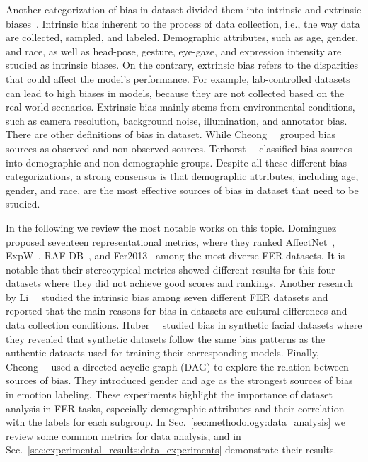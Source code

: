 Another categorization of bias in dataset divided them into intrinsic and extrinsic biases~\cite{mavadati2013disfa, srinivas2019face, singh2022anatomizing}. Intrinsic bias inherent to the process of data collection, i.e., the way data are collected, sampled, and labeled. Demographic attributes, such as age, gender, and race, as well as head-pose, gesture, eye-gaze, and expression intensity are studied as intrinsic biases. On the contrary, extrinsic bias refers to the disparities that could affect the model's performance. For example, lab-controlled datasets can lead to high biases in models, because they are not collected based on the real-world scenarios. Extrinsic bias mainly stems from environmental conditions, such as camera resolution, background noise, illumination, and annotator bias. There are other definitions of bias in dataset. While Cheong~\etal~\cite{cheong2023causal} grouped bias sources as observed and non-observed sources, Terhorst~\etal~\cite{terhorst2021comprehensive} classified bias sources into demographic and non-demographic groups. Despite all these different bias categorizations, a strong consensus is that demographic attributes, including age, gender, and race, are the most effective sources of bias in dataset that need to be studied.

In the following we review the most notable works on this topic. Dominguez~\etal~\cite{dominguez2024metrics} proposed seventeen representational metrics, where they ranked AffectNet~\cite{mollahosseini2017affectnet}, ExpW~\cite{zhang2018facial}, RAF-DB~\cite{li2017reliable}, and Fer2013~\cite{goodfellow2013challenges} among the most diverse FER datasets. It is notable that their stereotypical metrics showed different results for this four datasets where they did not achieve good scores and rankings. Another research by Li~\etal~\cite{li2020deeper} studied the intrinsic bias among seven different FER datasets and reported that the main reasons for bias in datasets are cultural differences and data collection conditions. Huber~\etal~\cite{huber2024bias} studied bias in synthetic facial datasets where they revealed that synthetic datasets follow the same bias patterns as the authentic datasets used for training their corresponding models. Finally, Cheong~\etal~\cite{cheong2023causal} used a directed acyclic graph (DAG) to explore the relation between sources of bias. They introduced gender and age as the strongest sources of bias in emotion labeling. These experiments highlight the importance of dataset analysis in FER tasks, especially demographic attributes and their correlation with the labels for each subgroup. In Sec.~\ref{sec:methodology:data_analysis} we review some common metrics for data analysis, and in Sec.~\ref{sec:experimental_results:data_experiments} demonstrate their results.

